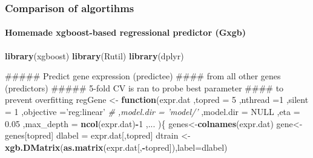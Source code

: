 \documentclass[]{article}
\newenvironment{Shaded}{\begin{snugshade}}{\end{snugshade}}
\newcommand{\KeywordTok}[1]{\textcolor[rgb]{0.13,0.29,0.53}{\textbf{#1}}}
\newcommand{\DataTypeTok}[1]{\textcolor[rgb]{0.13,0.29,0.53}{#1}}
\newcommand{\DecValTok}[1]{\textcolor[rgb]{0.00,0.00,0.81}{#1}}
\newcommand{\FloatTok}[1]{\textcolor[rgb]{0.00,0.00,0.81}{#1}}
\newcommand{\StringTok}[1]{\textcolor[rgb]{0.31,0.60,0.02}{#1}}
\newcommand{\CommentTok}[1]{\textcolor[rgb]{0.56,0.35,0.01}{\textit{#1}}}
\newcommand{\OtherTok}[1]{\textcolor[rgb]{0.56,0.35,0.01}{#1}}
\newcommand{\ControlFlowTok}[1]{\textcolor[rgb]{0.13,0.29,0.53}{\textbf{#1}}}
\newcommand{\OperatorTok}[1]{\textcolor[rgb]{0.81,0.36,0.00}{\textbf{#1}}}
\newcommand{\NormalTok}[1]{#1}
\let\oldparagraph\paragraph
\renewcommand{\paragraph}[1]{\oldparagraph{#1}\mbox{}}
\theoremstyle{definition}
\theoremstyle{definition}
\theoremstyle{definition}
\theoremstyle{remark}
\begin{document}
\subsubsection{Comparison of algortihms}\label{comparison-of-algortihms}

\paragraph{Homemade xgboost-based regressional predictor
(Gxgb)}\label{homemade-xgboost-based-regressional-predictor-gxgb}

\begin{Shaded}
\begin{Highlighting}[]
\KeywordTok{library}\NormalTok{(xgboost)}
\KeywordTok{library}\NormalTok{(Rutil)}
\KeywordTok{library}\NormalTok{(dplyr)}

\NormalTok{##### Predict gene expression (predictee) }
\NormalTok{#### from all other genes (predictors)}
\NormalTok{##### 5-fold CV is ran to probe best parameter}
\NormalTok{####  to prevent overfitting}
\NormalTok{regGene <-}\StringTok{ }\ControlFlowTok{function}\NormalTok{(expr.dat}
\NormalTok{  ,}\DataTypeTok{topred =} \DecValTok{5}
\NormalTok{  ,}\DataTypeTok{nthread =}\DecValTok{1}
\NormalTok{  ,}\DataTypeTok{silent =} \DecValTok{1}
\NormalTok{  ,}\DataTypeTok{objective =}\StringTok{'reg:linear'}
  \CommentTok{# ,model.dir = 'model/'}
\NormalTok{  ,}\DataTypeTok{model.dir =} \OtherTok{NULL}
\NormalTok{  ,}\DataTypeTok{eta =} \FloatTok{0.05}
\NormalTok{  ,}\DataTypeTok{max_depth =} \KeywordTok{ncol}\NormalTok{(expr.dat)}\OperatorTok{-}\DecValTok{1}
\NormalTok{  ,...}
\NormalTok{  )\{}
\NormalTok{  genes<-}\KeywordTok{colnames}\NormalTok{(expr.dat)}
\NormalTok{  gene<-genes[topred]}
\NormalTok{  dlabel =}\StringTok{ }\NormalTok{expr.dat[,topred]}
\NormalTok{  dtrain <-}\StringTok{ }\KeywordTok{xgb.DMatrix}\NormalTok{(}\KeywordTok{as.matrix}\NormalTok{(expr.dat[,}\OperatorTok{-}\NormalTok{topred]),}\DataTypeTok{label=}\NormalTok{dlabel)}


\end{Highlighting}
\end{Shaded}
\end{document}
